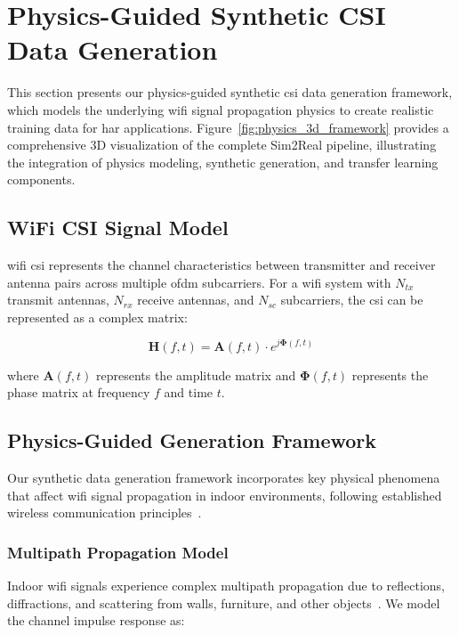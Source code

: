 \documentclass[journal]{IEEEtran}
\begin{document}
\section{Physics-Guided Synthetic CSI Data Generation}

This section presents our physics-guided synthetic \gls{csi} data generation framework, which models the underlying \gls{wifi} signal propagation physics to create realistic training data for \gls{har} applications. Figure~\ref{fig:physics_3d_framework} provides a comprehensive 3D visualization of the complete Sim2Real pipeline, illustrating the integration of physics modeling, synthetic generation, and transfer learning components.

\subsection{WiFi CSI Signal Model}

\gls{wifi} \gls{csi} represents the channel characteristics between transmitter and receiver antenna pairs across multiple \gls{ofdm} subcarriers. For a \gls{wifi} system with $N_{tx}$ transmit antennas, $N_{rx}$ receive antennas, and $N_{sc}$ subcarriers, the \gls{csi} can be represented as a complex matrix:

\begin{equation}
\mathbf{H}(f,t) = \mathbf{A}(f,t) \cdot e^{j\boldsymbol{\Phi}(f,t)}
\end{equation}

where $\mathbf{A}(f,t)$ represents the amplitude matrix and $\boldsymbol{\Phi}(f,t)$ represents the phase matrix at frequency $f$ and time $t$.

\subsection{Physics-Guided Generation Framework}

Our synthetic data generation framework incorporates key physical phenomena that affect \gls{wifi} signal propagation in indoor environments, following established wireless communication principles~\cite{goldsmith2005wireless}.

\subsubsection{Multipath Propagation Model}

Indoor \gls{wifi} signals experience complex multipath propagation due to reflections, diffractions, and scattering from walls, furniture, and other objects~\cite{multipath_fading2003}. We model the channel impulse response as:
\end{document}
